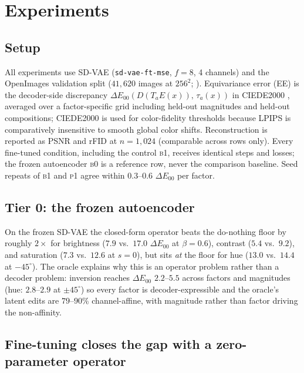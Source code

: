 \documentclass[11pt]{article}
\newcommand{\de}{\Delta E_{00}}
\begin{document}
\section{Experiments}
\label{sec:experiments}

\subsection{Setup}
All experiments use SD-VAE (\texttt{sd-vae-ft-mse}, $f{=}8$, 4 channels) and
the OpenImages validation split ($41{,}620$ images at $256^2$;
\citealp{kuznetsova2020openimages}). Equivariance error (EE) is the
decoder-side discrepancy $\de\!\left(D(T_a E(x)),\, \tau_a(x)\right)$ in
CIEDE2000 \citep{sharma2005ciede2000}, averaged over a factor-specific grid
including held-out magnitudes and held-out compositions; CIEDE2000 is used for
color-fidelity thresholds because LPIPS is comparatively insensitive to smooth
global color shifts. Reconstruction is reported as PSNR and rFID at
$n{=}1{,}024$ (comparable across rows only). Every fine-tuned condition,
including the control \textsc{b1}, receives identical steps and losses; the
frozen autoencoder \textsc{b0} is a reference row, never the comparison
baseline. Seed repeats of \textsc{b1} and \textsc{p1} agree within
$0.3$--$0.6$ $\de$ per factor.

\subsection{Tier 0: the frozen autoencoder}
\label{sec:tier0}

On the frozen SD-VAE the closed-form operator beats the do-nothing floor by
roughly $2\times$ for brightness ($7.9$ vs.\ $17.0$ $\de$ at $\beta{=}0.6$),
contrast ($5.4$ vs.\ $9.2$), and saturation ($7.3$ vs.\ $12.6$ at $s{=}0$),
but sits \emph{at} the floor for hue ($13.0$ vs.\ $14.4$ at $-45^\circ$). The
oracle explains why this is an operator problem rather than a decoder problem:
inversion reaches $\de$ $2.2$--$5.5$ across factors and magnitudes (hue:
$2.8$--$2.9$ at $\pm 45^\circ$) so every factor is decoder-expressible and the
oracle's latent edits are $79$--$90\%$ channel-affine, with magnitude rather
than factor driving the non-affinity.

\subsection{Fine-tuning closes the gap with a zero-parameter operator}
\label{sec:main}
\end{document}
